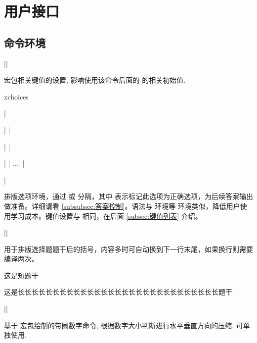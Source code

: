 \documentclass{xdyy-usermanual}
\begin{document}
\section{用户接口}



\subsection{命令环境}


\begin{function}[added = 2022-01-30]{\xchoicesetup}
  \begin{syntax}
    |\xchoicesetup| 
  \end{syntax}
  宏包相关键值的设置, 影响使用该命令后面的  的相关初始值.
\end{function}


\begin{function}[added = 2022-01-30]{xchoices}
  \begin{syntax}
    |\begin{xchoices}| 
    |  \item <item1>|
    |  \item* <item2>|
    |  ...|
    |\end{xchoices}|
  \end{syntax}
  排版选项环境，通过  或  分隔，其中  表示标记此选项为正确选项，为后续答案输出做准备。详细请看 \ref{subsubsec:答案控制}。语法与  环境等  环境类似，降低用户使用学习成本。键值设置与  相同，在后面 \ref{subsec:键值列表} 介绍。
\end{function}

\begin{function}{\xparen}
  \begin{syntax}
    |\xparen|
  \end{syntax}
  用于排版选择题题干后的括号，内容多时可自动换到下一行末尾，如果换行则需要编译两次。
  \begin{vexample}
    这是短题干 \xparen
  \end{vexample}
  \begin{vexample}
    这是长长长长长长长长长长长长长长长长长长长长长长长长长长长长长题干 \xparen
  \end{vexample}
\end{function}


\begin{function}{\quan}
  \begin{syntax}
    |\quan| 
  \end{syntax}
  基于  宏包绘制的带圈数字命令, 根据数字大小判断进行水平垂直方向的压缩, 可单独使用. 
  \begin{hexample}
      
  \end{hexample}
\end{function}
\end{document}
